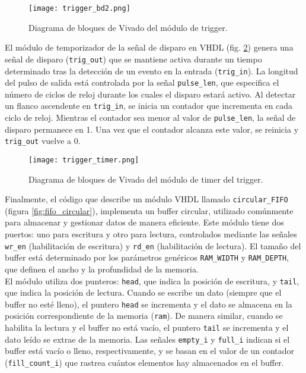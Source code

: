 \documentclass{report}
\begin{document}
\begin{figure}[H]
    \centering
    \texttt{[image: trigger\_bd2.png]}
    \caption{Diagrama de bloques de Vivado del módulo de trigger.}
    \label{fig:trigger_bd2}
\end{figure}

\noindent El módulo de temporizador de la señal de disparo en VHDL (fig. \ref{fig:trigger_timer}) genera una señal de disparo (\texttt{trig\_out}) que se mantiene activa durante un tiempo determinado tras la detección de un evento en la entrada (\texttt{trig\_in}). La longitud del pulso de salida está controlada por la señal \texttt{pulse\_len}, que especifica el número de ciclos de reloj durante los cuales el disparo estará activo. Al detectar un flanco ascendente en \texttt{trig\_in}, se inicia un contador que incrementa en cada ciclo de reloj. Mientras el contador sea menor al valor de \texttt{pulse\_len}, la señal de disparo permanece en 1. Una vez que el contador alcanza este valor, se reinicia y \texttt{trig\_out} vuelve a 0.

\begin{figure}[H]
    \centering
    \texttt{[image: trigger\_timer.png]}
    \caption{Diagrama de bloques de Vivado del módulo de timer del trigger.}
    \label{fig:trigger_timer}
\end{figure}

\noindent Finalmente, el código que describe un módulo VHDL llamado \texttt{circular\_FIFO} (figura \ref{fig:fifo_circular}), implementa un buffer circular, utilizado comúnmente para almacenar y gestionar datos de manera eficiente. Este módulo tiene dos puertos: uno para escritura y otro para lectura, controlados mediante las señales \texttt{wr\_en} (habilitación de escritura) y \texttt{rd\_en} (habilitación de lectura). El tamaño del buffer está determinado por los parámetros genéricos \texttt{RAM\_WIDTH} y \texttt{RAM\_DEPTH}, que definen el ancho y la profundidad de la memoria.\\

\noindent El módulo utiliza dos punteros: \texttt{head}, que indica la posición de escritura, y \texttt{tail}, que indica la posición de lectura. Cuando se escribe un dato (siempre que el buffer no esté lleno), el puntero \texttt{head} se incrementa y el dato se almacena en la posición correspondiente de la memoria (\texttt{ram}). De manera similar, cuando se habilita la lectura y el buffer no está vacío, el puntero \texttt{tail} se incrementa y el dato leído se extrae de la memoria. Las señales \texttt{empty\_i} y \texttt{full\_i} indican si el buffer está vacío o lleno, respectivamente, y se basan en el valor de un contador (\texttt{fill\_count\_i}) que rastrea cuántos elementos hay almacenados en el buffer.\\
\end{document}

